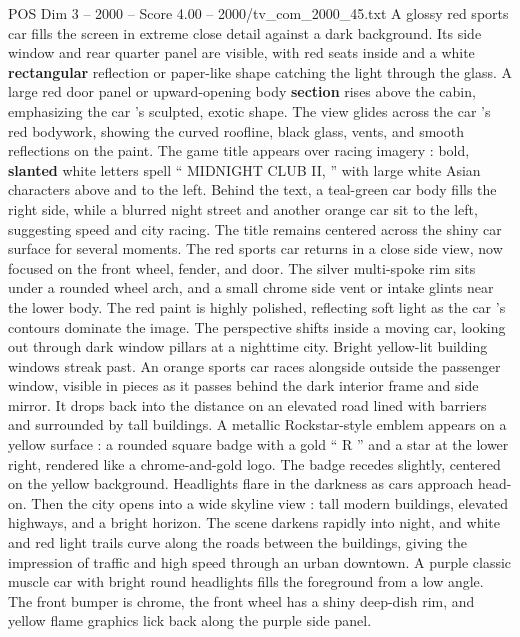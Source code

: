 \begin{textsample}{POS Dim 3 – 2000 – Score 4.00 – 2000/tv\_com\_2000\_45.txt}  \label{ex:f3_pos_070}
A glossy red sports car fills the screen in extreme close detail against a dark background.
Its side window and rear quarter panel are visible, with red seats inside and a white \textbf{rectangular} reflection or paper-like shape catching the light through the glass.
A large red door panel or upward-opening body \textbf{section} rises above the cabin, emphasizing the car ’s sculpted, exotic shape.
The view glides across the car ’s red bodywork, showing the curved roofline, black glass, vents, and smooth reflections on the paint.
The game title appears over racing imagery : bold, \textbf{slanted} white letters spell “ MIDNIGHT CLUB II, ” with large white Asian characters above and to the left.
Behind the text, a teal-green car body fills the right side, while a blurred night street and another orange car sit to the left, suggesting speed and city racing.
The title remains centered across the shiny car surface for several moments.
The red sports car returns in a close side view, now focused on the front wheel, fender, and door.
The silver multi-spoke rim sits under a rounded wheel arch, and a small chrome side vent or intake glints near the lower body.
The red paint is highly polished, reflecting soft light as the car ’s contours dominate the image.
The perspective shifts inside a moving car, looking out through dark window pillars at a nighttime city.
Bright yellow-lit building windows streak past.
An orange sports car races alongside outside the passenger window, visible in pieces as it passes behind the dark interior frame and side mirror.
It drops back into the distance on an elevated road lined with barriers and surrounded by tall buildings.
A metallic Rockstar-style emblem appears on a yellow surface : a rounded square badge with a gold “ R ” and a star at the lower right, rendered like a chrome-and-gold logo.
The badge recedes slightly, centered on the yellow background.
Headlights flare in the darkness as cars approach head-on.
Then the city opens into a wide skyline view : tall modern buildings, elevated highways, and a bright horizon.
The scene darkens rapidly into night, and white and red light trails curve along the roads between the buildings, giving the impression of traffic and high speed through an urban downtown.
A purple classic muscle car with bright round headlights fills the foreground from a low angle.
The front bumper is chrome, the front wheel has a shiny deep-dish rim, and yellow flame graphics lick back along the purple side panel.

\end{textsample}
